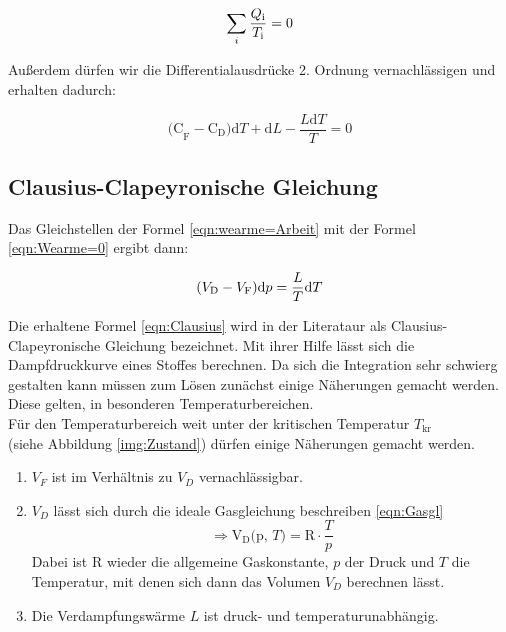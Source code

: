 \begin{equation}
    \sum_{i}\frac{Q_\text{i}}{T_\text{i}}=0\nonumber\\
\end{equation}

\noindent Außerdem dürfen wir die Differentialausdrücke 2. Ordnung vernachlässigen und erhalten dadurch:

\begin{equation} 
    \text{(C}_\text{F} - \text{C}_\text{D}\text{)d}T + \text{d}L -\frac{L\text{d}T}{T}= 0
    \label{eqn:Wearme=0}
\end{equation}

\subsection{Clausius-Clapeyronische Gleichung}

\noindent  Das Gleichstellen der Formel \eqref{eqn:wearme=Arbeit} mit der Formel \eqref{eqn:Wearme=0} ergibt dann:

\begin{equation}
    (V_\text{D}-V_\text{F})\text{d}p =\frac{L}{T}\text{d}T\\
    \label{eqn:Clausius}
\end{equation}

\noindent Die erhaltene Formel \eqref{eqn:Clausius} wird in der Literataur als Clausius-Clapeyronische Gleichung bezeichnet. Mit ihrer Hilfe 
lässt sich die Dampfdruckkurve eines Stoffes berechnen. Da sich die Integration sehr schwierg gestalten kann müssen zum Lösen
zunächst einige Näherungen gemacht werden. Diese gelten, in besonderen Temperaturbereichen.\\

\noindent Für den Temperaturbereich weit unter der kritischen Temperatur $T_\text{kr}$ \\ (siehe Abbildung \ref{img:Zustand}) dürfen einige 
Näherungen gemacht werden.
\begin{enumerate}
    \item $V_F$ ist im Verhältnis zu $V_D$ vernachlässigbar.
    \item $V_D$ lässt sich durch die ideale Gasgleichung beschreiben \eqref{eqn:Gasgl}\\
            \begin{equation}
                \Rightarrow \text{V}_\text{D} \text{(p, }T\text{)} = \text{R} \cdot \frac{T}{p} \nonumber
            \end{equation}
        Dabei ist R wieder die allgemeine Gaskonstante, $p$ der Druck und $T$ die Temperatur, mit denen sich dann das Volumen $V_D$ berechnen lässt.
    \item Die Verdampfungswärme $L$ ist druck- und temperaturunabhängig.
\end{enumerate}

